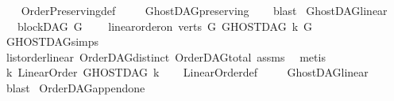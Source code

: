 \begin{isabellebody}
%
\isadelimproof
\ \ %
\endisadelimproof
%
\isatagproof
{}\isamarkupfalse%
\ Order{\isacharunderscore}{\kern0pt}Preserving{\isacharunderscore}{\kern0pt}def\ \isanewline
\ \ \isamarkupfalse%
\ GhostDAG{\isacharunderscore}{\kern0pt}preserving\isanewline
\ \ \isamarkupfalse%
\ blast%
\endisatagproof
{\isafoldproof}%
%
\isadelimproof
%
\endisadelimproof
%
\isadelimdocument
%
\endisadelimdocument
%
\isatagdocument
%
\isamarkuptrue%
%
\endisatagdocument
{\isafolddocument}%
%
\isadelimdocument
%
\endisadelimdocument
{}\isamarkupfalse%
\ GhostDAG{\isacharunderscore}{\kern0pt}linear{\isacharcolon}{\kern0pt}\ \isanewline
\ \ \ {\isachardoublequoteopen}blockDAG\ G{\isachardoublequoteclose}\ \isanewline
\ \ \ {\isachardoublequoteopen}linear{\isacharunderscore}{\kern0pt}order{\isacharunderscore}{\kern0pt}on\ {\isacharparenleft}{\kern0pt}verts\ G{\isacharparenright}{\kern0pt}\ {\isacharparenleft}{\kern0pt}GHOSTDAG\ k\ G{\isacharparenright}{\kern0pt}{\isachardoublequoteclose}\isanewline
%
\isadelimproof
\ \ %
\endisadelimproof
%
\isatagproof
{}\isamarkupfalse%
\ GHOSTDAG{\isachardot}{\kern0pt}simps\ \isanewline
\ \ \isamarkupfalse%
\ list{\isacharunderscore}{\kern0pt}order{\isacharunderscore}{\kern0pt}linear\ OrderDAG{\isacharunderscore}{\kern0pt}distinct\ OrderDAG{\isacharunderscore}{\kern0pt}total\ assms\ \isamarkupfalse%
\ metis%
\endisatagproof
{\isafoldproof}%
%
\isadelimproof
\isanewline
%
\endisadelimproof
\isanewline
{}\isamarkupfalse%
\ {\isachardoublequoteopen}{\isasymforall}k{\isachardot}{\kern0pt}\ Linear{\isacharunderscore}{\kern0pt}Order\ {\isacharparenleft}{\kern0pt}GHOSTDAG\ k{\isacharparenright}{\kern0pt}{\isachardoublequoteclose}\isanewline
%
\isadelimproof
\ \ %
\endisadelimproof
%
\isatagproof
{}\isamarkupfalse%
\ Linear{\isacharunderscore}{\kern0pt}Order{\isacharunderscore}{\kern0pt}def\ \isanewline
\ \ \isamarkupfalse%
\ GhostDAG{\isacharunderscore}{\kern0pt}linear\ \isamarkupfalse%
\ blast%
\endisatagproof
{\isafoldproof}%
%
\isadelimproof
%
\endisadelimproof
%
\isadelimdocument
%
\endisadelimdocument
%
\isatagdocument
%
\isamarkuptrue%
%
\endisatagdocument
{\isafolddocument}%
%
\isadelimdocument
%
\endisadelimdocument
{}\isamarkupfalse%
\ OrderDAG{\isacharunderscore}{\kern0pt}append{\isacharunderscore}{\kern0pt}one{\isacharcolon}{\kern0pt}\isanewline

\end{isabellebody}

